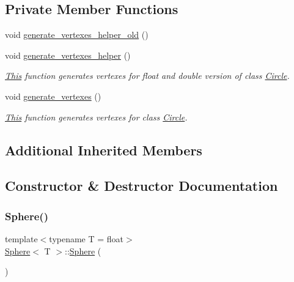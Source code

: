 \subsection*{Private Member Functions}
\begin{DoxyCompactItemize}
\item 
void \mbox{\hyperlink{classSphere_ab739ad1931e58a4ba7c84e3ca5c1965d}{generate\+\_\+vertexes\+\_\+helper\+\_\+old}} ()
\item 
void \mbox{\hyperlink{classSphere_a84a45f41ca9e630beb97fc106b359ffd}{generate\+\_\+vertexes\+\_\+helper}} ()
\begin{DoxyCompactList}\small\item\em \mbox{\hyperlink{classThis}{This}} function generates vertexes for float and double version of class \mbox{\hyperlink{classCircle}{Circle}}. \end{DoxyCompactList}\item 
void \mbox{\hyperlink{classSphere_a9cfac85b9803fadc4b79db0ea047f679}{generate\+\_\+vertexes}} ()
\begin{DoxyCompactList}\small\item\em \mbox{\hyperlink{classThis}{This}} function generates vertexes for class \mbox{\hyperlink{classCircle}{Circle}}. \end{DoxyCompactList}\end{DoxyCompactItemize}
\subsection*{Additional Inherited Members}


\subsection{Constructor \& Destructor Documentation}
\mbox{\label{classSphere_acacfd6de079ea50acdaf57b823166651}} 
\subsubsection{\texorpdfstring{Sphere()}{Sphere()}\hspace{0.1cm}{\footnotesize\ttfamily [1/4]}}
{\footnotesize\ttfamily template$<$typename T = float$>$ \\
\mbox{\hyperlink{classSphere}{Sphere}}$<$ T $>$\+::\mbox{\hyperlink{classSphere}{Sphere}} (\begin{DoxyParamCaption}{ }\end{DoxyParamCaption})\hspace{0.3cm}{\ttfamily [inline]}}



